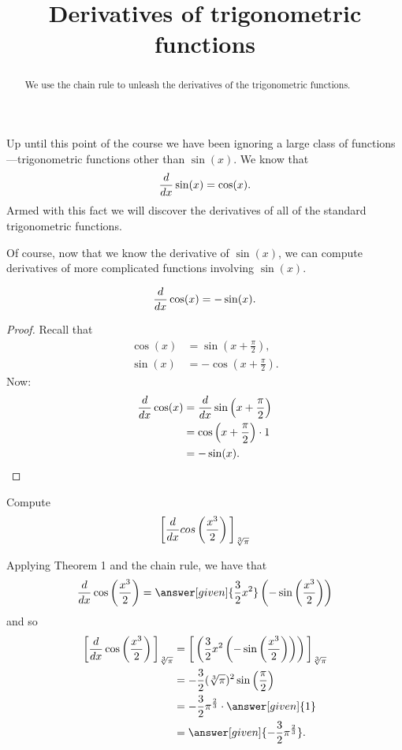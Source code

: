 \documentclass{ximera}
\title[Dig-In:]{Derivatives of trigonometric functions}
\begin{document}
\begin{abstract}
  We use the chain rule to unleash the derivatives of the
  trigonometric functions.
\end{abstract}
\maketitle


Up until this point of the course we have been ignoring a large class
of functions---trigonometric functions other than $\sin(x)$. We know that
\[
\frac{d}{dx} \sin(x) = \cos(x).
\]
Armed with this fact we will discover the derivatives of all of the
standard trigonometric functions.


Of course, now that we know the derivative of $\sin(x)$, we can compute
derivatives of more complicated functions involving $\sin(x)$.


\begin{theorem}
\[
\frac{d}{dx} \cos(x) = -\sin(x).
\]
\begin{proof}
Recall that
\begin{align*}
\cos(x) &= \sin\left(x+\frac{\pi}{2}\right), \\
\sin(x) &= -\cos\left(x+\frac{\pi}{2}\right).
\end{align*}
Now:
\begin{align*}
\frac{d}{dx} \cos(x) &= \frac{d}{dx} \sin\left(x+\frac{\pi}{2}\right)\\
&=\cos\left(x+\frac{\pi}{2}\right)\cdot 1 \\
&= -\sin(x).
\end{align*}
\end{proof}
\end{theorem}

\begin{example}
Compute
\[
\bigg[ \frac{d}{dx} cos \left( \frac{x^3}{2} \right) \bigg]_{\sqrt[3]{\pi}}
\]
\begin{explanation}
Applying Theorem 1 and the chain rule, we have that
\[
\ddx \cos \left( \frac{x^3}{2} \right) = \answer[given]{\frac{3}{2} x^2} \left(- \sin \left( \frac{x^3}{2} \right) \right)
\]
and so
\begin{align*}
\eval{\ddx \cos \left( \frac{x^3}{2} \right)}_{\sqrt[3]{\pi}} &= \eval{\left( \frac{3}{2} x^2 \left(- \sin \left( \frac{x^3}{2} \right) \right) \right)}_{\sqrt[3]{\pi}}  \\
&= - \frac{3}{2} (\sqrt[3]{\pi})^2 \sin \left( \frac{\pi}{2} \right)  \\
&= - \frac{3}{2} \pi^{\frac{2}{3}} \cdot \answer[given]{1}  \\
&= \answer[given]{ - \frac{3}{2} \pi^{\frac{2}{3}}}.
\end{align*}
\end{explanation}
\end{example}
\end{document}
